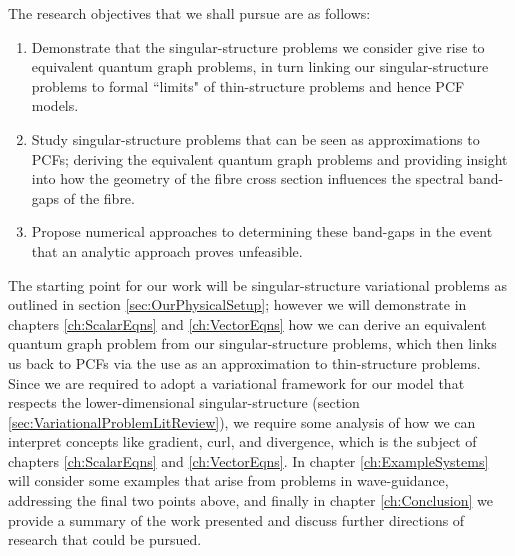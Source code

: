 The research objectives that we shall pursue are as follows:
\begin{enumerate}
	\item Demonstrate that the singular-structure problems we consider give rise to equivalent quantum graph problems, in turn linking our singular-structure problems to formal ``limits" of thin-structure problems and hence PCF models.
	\item Study singular-structure problems that can be seen as approximations to PCFs; deriving the equivalent quantum graph problems and providing insight into how the geometry of the fibre cross section influences the spectral band-gaps of the fibre.
	\item Propose numerical approaches to determining these band-gaps in the event that an analytic approach proves unfeasible.
\end{enumerate}
The starting point for our work will be singular-structure variational problems as outlined in section \ref{sec:OurPhysicalSetup}; however we will demonstrate in chapters \ref{ch:ScalarEqns} and \ref{ch:VectorEqns} how we can derive an equivalent quantum graph problem from our singular-structure problems, which then links us back to PCFs via the use as an approximation to thin-structure problems.
Since we are required to adopt a variational framework for our model that respects the lower-dimensional singular-structure (section \ref{sec:VariationalProblemLitReview}), we require some analysis of how we can interpret concepts like gradient, curl, and divergence, which is the subject of chapters \ref{ch:ScalarEqns} and \ref{ch:VectorEqns}.
In chapter \ref{ch:ExampleSystems} will consider some examples that arise from problems in wave-guidance, addressing the final two points above, and finally in chapter \ref{ch:Conclusion} we provide a summary of the work presented and discuss further directions of research that could be pursued.